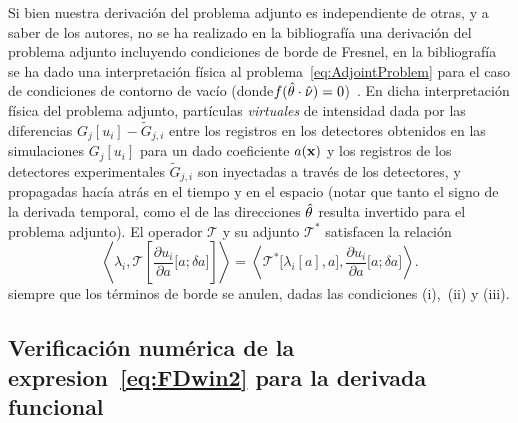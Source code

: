 Si bien nuestra derivación del problema adjunto es independiente de otras, 
y a saber de los autores, no se ha realizado en la bibliografía una derivación 
del problema adjunto incluyendo condiciones de borde de Fresnel, 
en la bibliografía se ha dado una interpretación física al 
problema~\eqref{eq:AdjointProblem} para el caso de condiciones 
de contorno de vacío (donde$f(\hat{\theta} \cdot \hat{\nu})=0$)~\cite{Dorn,Dorn2000}. 
En dicha interpretación física del problema adjunto, partículas \textit{virtuales} 
de intensidad dada por las diferencias $G_j[u_i]-\tilde {G}_{j,i} $ 
entre los registros en los detectores obtenidos en las simulaciones $G_j[u_i]$ para un 
dado coeficiente $a(\mathbf{x})$ y los registros de los detectores experimentales $\tilde {G}_{j,i}$ 
son inyectadas a través de los detectores, y propagadas hacía atrás en el tiempo 
y en el espacio (notar que tanto el signo de la derivada temporal, 
como el de las direcciones $\hat{\theta}$ resulta invertido para el problema adjunto).
El operador $\mathcal{T}$ y su adjunto $\mathcal{T}^*$ 
satisfacen la relación
\begin{equation}
\left \langle \lambda_i , 
 \mathcal{T}\left[\frac{\partial u_i}{\partial a}\big[a;\delta a\big]\right] \right \rangle=
\left \langle \mathcal{T}^* \big[\lambda_i[a],a \big] , 
 \frac{\partial u_i}{\partial a}\big[a;\delta a\big] \right \rangle.
\label{eq:RRTEdet6}
\end{equation}
siempre que los términos de borde se anulen, dadas las condiciones (i),~(ii) y (iii).
 \subsection{Verificación numérica de la expresion~\eqref{eq:FDwin2} para la derivada 
 funcional}
 \label{sec:gradc}
 
